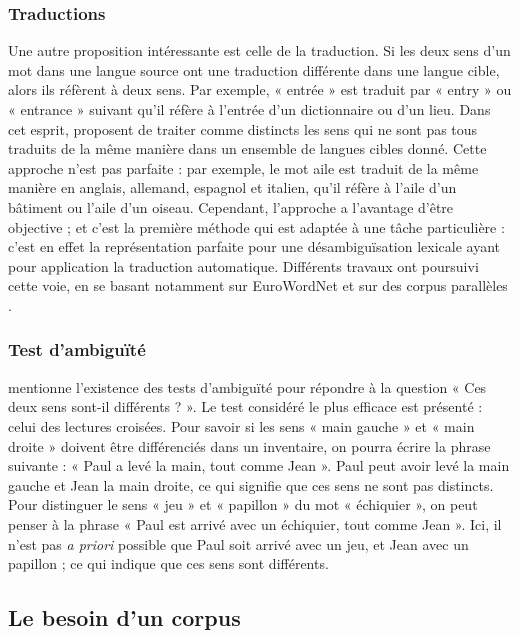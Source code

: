\subsubsection{Traductions}

Une autre proposition intéressante est celle de la traduction. Si les deux sens
d'un mot dans une langue source ont une traduction différente dans une langue
cible, alors ils réfèrent à deux sens. Par exemple, « entrée » est traduit par
« entry » ou « entrance » suivant qu'il réfère à l'entrée d'un dictionnaire ou
d'un lieu. Dans cet esprit, \cite{resnik1997perspective} proposent de traiter
comme distincts les sens qui ne sont pas tous traduits de la même manière dans
un ensemble de langues cibles donné. Cette approche n'est pas parfaite : par
exemple, le mot aile est traduit de la même manière en anglais, allemand,
espagnol et italien, qu'il réfère à l'aile d'un bâtiment ou l'aile d'un oiseau.
Cependant, l'approche a l'avantage d'être objective ; et c'est la première
méthode qui est adaptée à une tâche particulière : c'est en effet la
représentation parfaite pour une désambiguïsation lexicale ayant pour
application la traduction automatique. Différents travaux ont poursuivi cette
voie, en se basant notamment sur EuroWordNet \citep{tufis2006from} et sur des
corpus parallèles \citep{chan2007nus,zhong2009word,plas2011automatic}.

\subsubsection{Test d'ambiguïté}

\cite{kilgarriff1997don} mentionne l'existence des tests d'ambiguïté pour
répondre à la question « Ces deux sens sont-il différents ? ». Le test
considéré le plus efficace est présenté : celui des lectures croisées. Pour
savoir si les sens « main gauche » et « main droite » doivent être différenciés
dans un inventaire, on pourra écrire la phrase suivante : « Paul a levé la
main, tout comme Jean ». Paul peut avoir levé la main gauche et Jean la main
droite, ce qui signifie que ces sens ne sont pas distincts. Pour distinguer le
sens « jeu » et « papillon » du mot « échiquier », on peut penser à la phrase «
Paul est arrivé avec un échiquier, tout comme Jean ». Ici, il n'est pas
\textit{a priori} possible que Paul soit arrivé avec un jeu, et Jean avec un
papillon ; ce qui indique que ces sens sont différents.

\subsection{Le besoin d'un corpus}
\label{besoincorpus}

